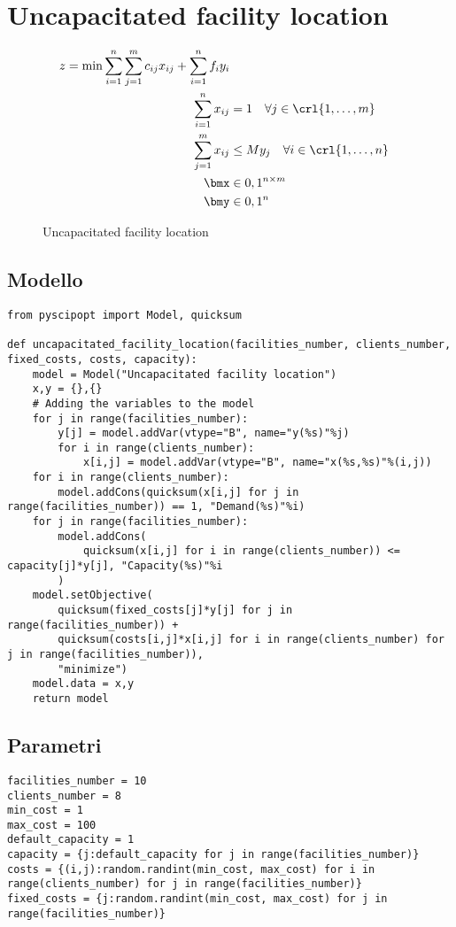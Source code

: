 \documentclass[\main/main.tex]{subfiles}
\begin{document}
\chapter{Uncapacitated facility location}

\begin{figure}
    \begin{align*}
        z = \min \sum_{i=1}^n \sum_{j=1}^m c_{ij} x_{ij} + \sum_{i=1}^n f_i y_i\\
        \sum_{i=1}^n x_{ij} &= 1 \quad \forall j \in \crl{1, \ldots, m}\\
        \sum_{j=1}^m x_{ij} &\leq M y_j \quad \forall i \in \crl{1, \ldots, n}\\
        \bmx &\in {0,1}^{n\times m}\\
        \bmy &\in {0,1}^n
    \end{align*}
    \caption{Uncapacitated facility location}
\end{figure}

\section{Modello}
\begin{verbatim}
from pyscipopt import Model, quicksum

def uncapacitated_facility_location(facilities_number, clients_number, fixed_costs, costs, capacity):
    model = Model("Uncapacitated facility location")
    x,y = {},{}
    # Adding the variables to the model
    for j in range(facilities_number):
        y[j] = model.addVar(vtype="B", name="y(%s)"%j)
        for i in range(clients_number):
            x[i,j] = model.addVar(vtype="B", name="x(%s,%s)"%(i,j))
    for i in range(clients_number):
        model.addCons(quicksum(x[i,j] for j in range(facilities_number)) == 1, "Demand(%s)"%i)
    for j in range(facilities_number):
        model.addCons(
            quicksum(x[i,j] for i in range(clients_number)) <= capacity[j]*y[j], "Capacity(%s)"%i
        )
    model.setObjective(
        quicksum(fixed_costs[j]*y[j] for j in range(facilities_number)) +
        quicksum(costs[i,j]*x[i,j] for i in range(clients_number) for j in range(facilities_number)),
        "minimize")
    model.data = x,y
    return model
\end{verbatim}
\clearpage
\section{Parametri}
\begin{verbatim}
facilities_number = 10
clients_number = 8
min_cost = 1
max_cost = 100
default_capacity = 1
capacity = {j:default_capacity for j in range(facilities_number)}
costs = {(i,j):random.randint(min_cost, max_cost) for i in range(clients_number) for j in range(facilities_number)}
fixed_costs = {j:random.randint(min_cost, max_cost) for j in range(facilities_number)}
\end{verbatim}
\end{document}
